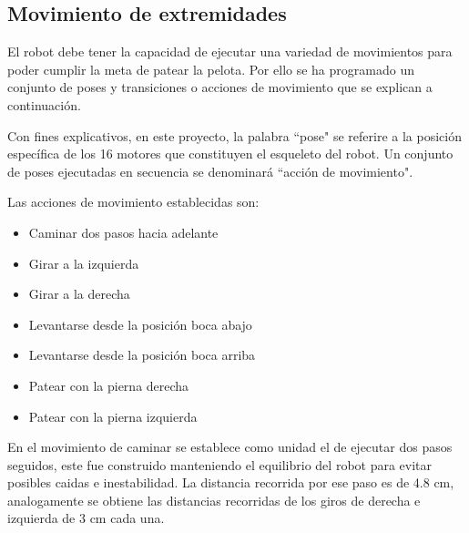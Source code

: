 
\subsection{Movimiento de extremidades}\label{esqueleto}

El robot debe tener la capacidad de ejecutar una variedad de movimientos para poder cumplir la meta de patear la pelota. Por ello se ha programado un conjunto de poses y transiciones o acciones de movimiento que se explican a continuación.

Con fines explicativos, en este proyecto, la palabra ``pose" se referire a la posición específica de los 16 motores que constituyen el esqueleto del robot. Un conjunto de poses ejecutadas en secuencia se denominará ``acción de movimiento".

Las acciones de movimiento establecidas son:

\begin{itemize}
 \item {Caminar dos pasos hacia adelante}
 \item {Girar a la izquierda}
 \item {Girar a la derecha}
 \item {Levantarse desde la posición boca abajo}
 \item {Levantarse desde la posición boca arriba}
 \item {Patear con la pierna derecha }
 \item {Patear con la pierna izquierda}
 
\end{itemize}

En el movimiento de caminar se establece como unidad el de ejecutar dos pasos seguidos, este fue construido manteniendo el equilibrio del robot para evitar posibles caidas e inestabilidad. La distancia recorrida por ese paso es de 4.8 cm, analogamente se obtiene las distancias recorridas de los giros de derecha e izquierda de 3 cm cada una. 

